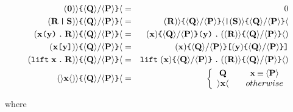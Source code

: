 \documentclass{amsart}
\newcommand{\id}[1]{\texttt{#1}}
\newcommand{\juxtap}{\mathbin{\id{|}}}
\newcommand{\concat}{\mathbin{\id{.}}}
\newcommand{\scong}{\mathbin{\equiv}}
\newcommand{\category}[1]{\mbox{\bf #1}}
\theoremstyle{definition}
\theoremstyle{remark}
\numberwithin{equation}{subsection}
\newcommand{\lpquote}{\langle}
\newcommand{\rpquote}{\rangle}
\begin{document}
\begin{eqnarray*}
(\category{0}) \rpquote \id{\{}\lpquote \category{Q} \rpquote / \lpquote \category{P} \rpquote \id{\}} \lpquote         & = &    0 \\
(\category{R} \juxtap \category{S}) \rpquote \id{\{} \lpquote \category{Q} \rpquote / \lpquote \category{P} \rpquote \id{\}} \lpquote      
		& = &    
		(\category{R})\rpquote \id{\{} \lpquote \category{Q} \rpquote / \lpquote \category{P} \rpquote \id{\}} \lpquote \juxtap (\category{S})\rpquote \id{\{} \lpquote \category{Q} \rpquote / \lpquote \category{P} \rpquote \id{\}} \lpquote \\
(\category{x} \id{(} \category{y}\id{)}\concat\category{R}) \rpquote \id{\{} \lpquote \category{Q} \rpquote / \lpquote \category{P} \rpquote \id{\}} \lpquote    
		& = &    
		(\category{x})\id{\{} \lpquote \category{Q} \rpquote / \lpquote \category{P} \rpquote \id{\}} \id{(}\category{y}\id{)}\concat( (\category{R}) \rpquote \id{\{} \lpquote \category{Q} \rpquote / \lpquote \category{P} \rpquote \id{\}} \lpquote ) \\
(\category{x}\id{[}\category{y}\id{]}) \rpquote \id{\{} \lpquote \category{Q} \rpquote / \lpquote \category{P} \rpquote \id{\}} \lpquote
		& = &    
		(\category{x})\id{\{} \lpquote \category{Q} \rpquote / \lpquote \category{P} \rpquote \id{\}} \id{[}(\category{y})\id{\{} \lpquote \category{Q} \rpquote / \lpquote \category{P} \rpquote \id{\}} \id{]} \\
(\id{lift} \; \category{x}\concat\category{R}) \rpquote \id{\{} \lpquote \category{Q} \rpquote / \lpquote \category{P} \rpquote \id{\}} \lpquote  
		& = &    
		\id{lift} \; (\category{x})\id{\{} \lpquote \category{Q} \rpquote / \lpquote \category{P} \rpquote \id{\}}\concat( (\category{R} ) \rpquote \id{\{} \lpquote \category{Q} \rpquote / \lpquote \category{P} \rpquote \id{\}} \lpquote ) \\
(\rpquote \category{x} \lpquote) \rpquote \id{\{} \lpquote \category{Q} \rpquote / \lpquote \category{P} \rpquote \id{\}} \lpquote       
		& = & 
		\left\{ 
			\begin{array}{ccc} 
				\category{Q} & & \category{x} \scong \lpquote \category{P} \rpquote \\
                              	\rpquote \category{x} \lpquote & & otherwise \\
			\end{array}
		\right.
\end{eqnarray*}
 

where
\end{document}
